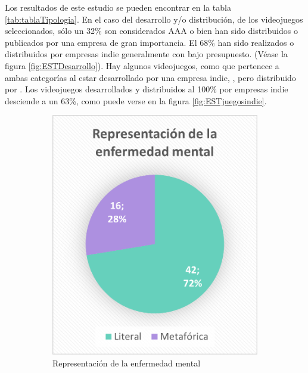 \documentclass[12pt, a4paper,twoside,titlepage]{book}
\begin{document}
Los resultados de este estudio se pueden encontrar en la tabla \ref{tab:tablaTipologia}. En el caso del desarrollo y/o distribución, de los videojuegos seleccionados, sólo un 32\% son considerados AAA o bien han sido distribuidos o publicados por una empresa de gran importancia. El 68\% han sido realizados o distribuidos por empresas indie generalmente con bajo presupuesto. (Véase la figura \ref{fig:ESTDesarrollo}). Hay algunos videojuegos, como  que pertenece a ambas categorías al estar desarrollado por una empresa indie, \cite{supermassive}, pero distribuido por \cite{sony}. Los videojuegos desarrollados y distribuidos al 100\% por empresas indie desciende a un 63\%, como puede verse en la figura \ref{fig:ESTjuegosindie}. 




\begin{figure}
\centering
\begin{subfigure}{.4\textwidth}
  \centering
  \includegraphics[width=.95\linewidth]{Graficas estudio/G9; Repmetlit.png}
  \caption{Representación de la enfermedad mental}
\end{subfigure}%
\begin{subfigure}{.6\textwidth}
  \centering

\end{subfigure}
\end{figure}
\end{document}
